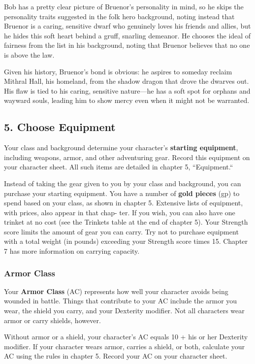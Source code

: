 Bob has a pretty clear picture of Bruenor’s personality in mind, so he skips the personality traits suggested in the folk hero background, noting instead that Bruenor is a caring, sensitive dwarf who genuinely loves his friends and allies, but he hides this soft heart behind a gruff, snarling demeanor. He chooses the ideal of fairness from the list in his background, noting that Bruenor believes that no one is above the law.

Given his history, Bruenor’s bond is obvious: he aspires to someday reclaim Mithral Hall, his homeland, from the shadow dragon that drove the dwarves out. His flaw is tied to his caring, sensitive nature—he has a soft spot for orphans and wayward souls, leading him to show mercy even when it might not be warranted.

\subsection{5. Choose Equipment}
Your class and background determine your character’s \textbf{starting equipment}, including weapons, armor, and other adventuring gear. Record this equipment on your character sheet. All such items are detailed in chapter 5, “Equipment.“

Instead of taking the gear given to you by your class and background, you can purchase your starting equipment. You have a number of \textbf{gold pieces} (gp) to spend based on your class, as shown in chapter 5. Extensive lists of equipment, with prices, also appear in that chap- ter. If you wish, you can also have one trinket at no cost (see the Trinkets table at the end of chapter 5).
Your Strength score limits the amount of gear you can carry. Try not to purchase equipment with a total weight (in pounds) exceeding your Strength score times 15. Chapter 7 has more information on carrying capacity.

\subsubsection{Armor Class}
Your \textbf{Armor Class} (AC) represents how well your character avoids being wounded in battle. Things that contribute to your AC include the armor you wear, the shield you carry, and your Dexterity modifier. Not all characters wear armor or carry shields, however.

Without armor or a shield, your character’s AC equals 10 + his or her Dexterity modifier. If your character wears armor, carries a shield, or both, calculate your AC using the rules in chapter 5. Record your AC on your character sheet.

